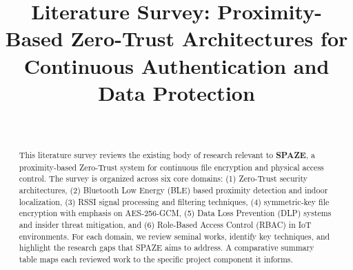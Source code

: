 \documentclass[conference]{IEEEtran}
\begin{document}
\title{Literature Survey: Proximity-Based Zero-Trust Architectures for Continuous Authentication and Data Protection}

\author{
    \\[1em]
}

\maketitle

\begin{abstract}
This literature survey reviews the existing body of research relevant to \textbf{SPAZE}, a proximity-based Zero-Trust system for continuous file encryption and physical access control. The survey is organized across six core domains: (1) Zero-Trust security architectures, (2) Bluetooth Low Energy (BLE) based proximity detection and indoor localization, (3) RSSI signal processing and filtering techniques, (4) symmetric-key file encryption with emphasis on AES-256-GCM, (5) Data Loss Prevention (DLP) systems and insider threat mitigation, and (6) Role-Based Access Control (RBAC) in IoT environments. For each domain, we review seminal works, identify key techniques, and highlight the research gaps that SPAZE aims to address. A comparative summary table maps each reviewed work to the specific project component it informs.
\end{abstract}
\end{document}

